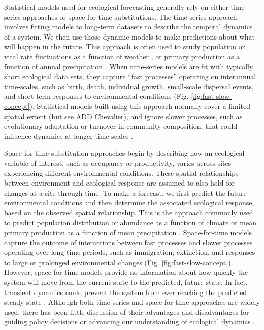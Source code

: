 \documentclass[11pt]{article}
\begin{document}
Statistical models used for ecological forecasting generally rely on either time-series approaches or space-for-time substitutions. The time-series approach involves fitting models to long-term datasets to describe the temporal dynamics of a system.  We then use those dynamic models to make predictions about what will happen in the future. This approach is often used to study population or vital rate fluctuations as a function of weather \citep{dalgleish_climate_2011}, or primary production as a function of annual precipitation \citep{lauenroth_long-term_1992}. When time-series models are fit with typically short ecological data sets, they capture ``fast processes'' operating on interannual time-scales, such as birth, death, individual growth, small-scale dispersal events, and short-term responses to environmental conditions (Fig. \ref{fig:fast-slow-concept}). Statistical models built using this approach normally cover a limited spatial extent (but see \citealt{Hefley2017,kleinhesselink_response_2018} ADD Chevalier), and ignore slower processes, such as evolutionary adaptation or turnover in community composition, that could influence dynamics at longer time scales \citep{clark_ecological_2001}. 

Space-for-time substitution approaches begin by describing how an ecological variable of interest, such as occupancy or productivity,  varies across sites experiencing different environmental conditions. These spatial relationships between environment and ecological response are assumed to also hold for changes at a site through time. To make a forecast, we first predict the future environmental conditions and then determine the associated ecological response, based on the observed spatial relationship.  This is the approach commonly used to predict population distribution or abundance as a function of climate \citep{elith_species_2009} or mean primary production as a function of mean precipitation \citep{Sala1988}. Space-for-time models capture the outcome of interactions between fast processes and slower processes operating over long time periods, such as immigration, extinction, and responses to large or prolonged environmental changes (Fig. \ref{fig:fast-slow-concept}). However, space-for-time models provide no information about how quickly the system will move from the current state to the predicted, future state. In fact, transient dynamics could prevent the system from ever reaching the predicted steady state \citep{Urban2012}. Although both time-series and space-for-time approaches are widely used, there has been little discussion of their advantages and disadvantages for guiding policy decisions or advancing our understanding of ecological dynamics \citep{harris_forecasting_2018,Renwick2018}. 
\end{document}

